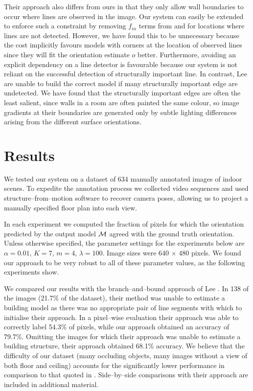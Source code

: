 Their approach also differs from ours in that they only allow wall
boundaries to occur where lines are observed in the image. Our system
can easily be extended to enforce such a constraint by removing
$f_{in}$ terms from  and
 for locations where lines are not
detected. However, we have found this to be unnecessary because the
cost  implicitly favours models with corners at the
location of observed lines since they will fit the orientation
estimate $o$ better. Furthermore, avoiding an explicit dependency on a
line detector is favourable because our system is not reliant on the
successful detection of structurally important line. In contrast, Lee
\etal are unable to build the correct model if many structurally
important edge are undetected. We have found that the structurally
important edges are often the least salient, since walls in a room are
often painted the same colour, so image gradients at their boundaries
are generated only by subtle lighting differences arising from the
different surface orientations.

\section{Results}
\label{sect:results}

We tested our system on a dataset of 634 manually annotated images of
indoor scenes. To expedite the annotation process we collected video
sequences and used structure--from--motion software to recover camera
poses, allowing us to project a manually specified floor plan into
each view.

In each experiment we computed the fraction of pixels for which the
orientation predicted by the output model $\mathcal{M}$ agreed with the
ground truth orientation. Unless otherwise specified, the parameter
settings for the experiments below are $\alpha=0.01$, $K=7$, $m=4$,
$\lambda=100$.  Image sizes were 640 $\times$ 480 pixels.  We found
our approach to be very robust to all of these parameter values, as
the following experiments show.

We compared our results with the branch--and--bound approach of Lee
\etal \cite{Lee09}. In 138 of the images (21.7\% of the dataset),
their method was unable to estimate a building model as there was no
appropriate pair of line segments with which to initialise their
approach. In a pixel--wise evaluation their approach was able to
correctly label 54.3\% of pixels, while our approach obtained an
accuracy of 79.7\%. Omitting the images for which their approach was
unable to estimate a building structure, their approach obtained
68.1\% accuracy. We believe that the difficulty of our dataset (many
occluding objects, many images without a view of both floor and
ceiling) accounts for the significantly lower performance in
comparison to that quoted in \cite{Lee09}. Side--by--side comparisons
with their approach are included in additional material.

